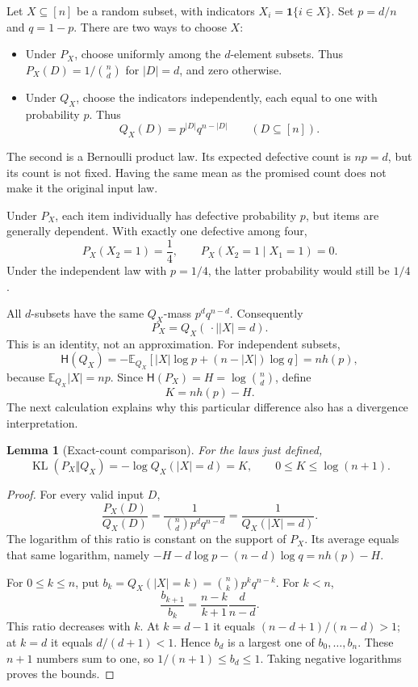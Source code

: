 \documentclass[11pt]{article}
\newtheorem{lemma}[theorem]{Lemma}
\theoremstyle{definition}
\theoremstyle{remark}
\newcommand{\E}{\mathbb E}
\newcommand{\Ent}{\mathsf H}
\newcommand{\KL}{\operatorname{KL}}
\numberwithin{equation}{section}
\begin{document}
Let \(X\subseteq[n]\) be a random subset, with indicators
\(X_i=\mathbf1\{i\in X\}\). Set \(p=d/n\) and \(q=1-p\).
There are two ways to choose \(X\):
\begin{itemize}
\item Under \(P_X\), choose uniformly among the \(d\)-element subsets.
Thus \(P_X(D)=1/\binom nd\) for \(|D|=d\), and zero otherwise.
\item Under \(Q_X\), choose the indicators independently, each equal
to one with probability \(p\). Thus
\[
 Q_X(D)=p^{|D|}q^{n-|D|}\qquad(D\subseteq[n]).
\]
\end{itemize}
The second is a Bernoulli product law. Its expected defective count
is \(np=d\), but its count is not fixed. Having the same mean as the
promised count does not make it the original input law.

Under \(P_X\), each item individually has defective probability \(p\),
but items are generally dependent. With exactly one defective among four,
\[
 P_X(X_2=1)=\frac14,\qquad
 P_X(X_2=1\mid X_1=1)=0.
\]
Under the independent law with \(p=1/4\), the latter probability
would still be \(1/4\).

All \(d\)-subsets have the same \(Q_X\)-mass \(p^dq^{n-d}\).
Consequently
\begin{equation}\label{eq:conditionrank}
 P_X=Q_X(\,\cdot\mid |X|=d).
\end{equation}
This is an identity, not an approximation.
For independent subsets,
\[
 \Ent(Q_X)
 =-\E_{Q_X}[|X|\log p+(n-|X|)\log q]=nh(p),
\]
because \(\E_{Q_X}|X|=np\).
Since \(\Ent(P_X)=H=\log\binom nd\), define
\begin{equation}\label{eq:Kdefinition}
 K=nh(p)-H.
\end{equation}
The next calculation explains why this particular difference also
has a divergence interpretation.

\begin{lemma}[Exact-count comparison]\label{lem:rank}
For the laws just defined,
\begin{equation}\label{eq:rankcost}
 \KL(P_X\Vert Q_X)=-\log Q_X(|X|=d)=K,\qquad
 0\le K\le\log(n+1).
\end{equation}
\end{lemma}
\begin{proof}
For every valid input \(D\),
\[
 \frac{P_X(D)}{Q_X(D)}
 =\frac1{\binom nd p^dq^{n-d}}
 =\frac1{Q_X(|X|=d)}.
\]
The logarithm of this ratio is constant on the support of \(P_X\).
Its average equals that same logarithm, namely
\(-H-d\log p-(n-d)\log q=nh(p)-H\).

For \(0\le k\le n\), put
\(b_k=Q_X(|X|=k)=\binom nk p^kq^{n-k}\).
For \(k<n\),
\[
 \frac{b_{k+1}}{b_k}=\frac{n-k}{k+1}\frac{d}{n-d}.
\]
This ratio decreases with \(k\). At \(k=d-1\) it equals
\((n-d+1)/(n-d)>1\); at \(k=d\) it equals \(d/(d+1)<1\).
Hence \(b_d\) is a largest one of \(b_0,\ldots,b_n\).
These \(n+1\) numbers sum to one, so \(1/(n+1)\le b_d\le1\).
Taking negative logarithms proves the bounds.
\end{proof}
\end{document}
